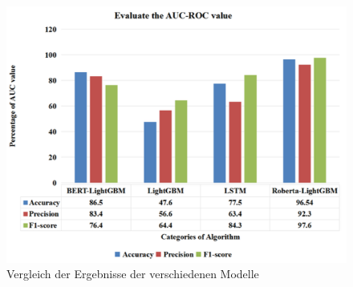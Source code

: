 \begin{figure}[htbp]
    \begin{center}
    \includegraphics[scale=0.5]{static/roberta_lightgbm_auc_roc_value.png}
    \caption{\label{fig:roberta_lightgbm_auc_roc_value} Vergleich der Ergebnisse der verschiedenen Modelle \cite{V_G_2024}}
    \end{center}
\end{figure}

